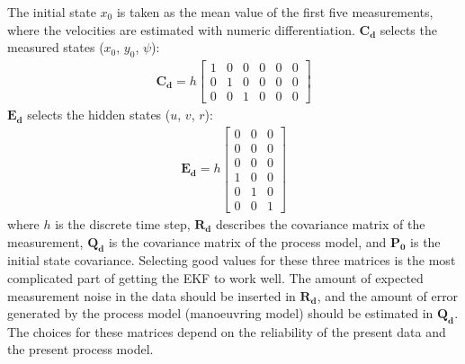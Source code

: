 The initial state \(x_0\) is taken as the mean value of the first five measurements, where the velocities are estimated with numeric differentiation.
\(\mathbf{C_d}\) selects the measured states (\(x_0\), \(y_0\), \(\psi\)):
\begin{equation}\label{equation:04.01_EK:eqcd}
\begin{split}\displaystyle \mathbf{C_{d}} = h \left[\begin{matrix}1 & 0 & 0 & 0 & 0 & 0\\0 & 1 & 0 & 0 & 0 & 0\\0 & 0 & 1 & 0 & 0 & 0\end{matrix}\right]\end{split}
\end{equation}
\(\mathbf{E_d}\) selects the hidden states (\(u\), \(v\), \(r\)):
\begin{equation}\label{equation:04.01_EK:eqed}
\begin{split}\displaystyle \mathbf{E_{d}} = h \left[\begin{matrix}0 & 0 & 0\\0 & 0 & 0\\0 & 0 & 0\\1 & 0 & 0\\0 & 1 & 0\\0 & 0 & 1\end{matrix}\right]\end{split}
\end{equation}
where \(h\) is the discrete time step, \(\mathbf{R_d}\) describes the covariance matrix of the measurement, \(\mathbf{Q_d}\) is the covariance matrix of the process model, and \(\mathbf{P_0}\) is the initial state covariance.
Selecting good values for these three matrices is the most complicated part of getting the EKF to work well. The amount of expected measurement noise in the data should be inserted in \(\mathbf{R_d}\), and the amount of error generated by the process model (manoeuvring model) should be estimated in \(\mathbf{Q_d}\). The choices for these matrices depend on the reliability of the present data and the present process model.
